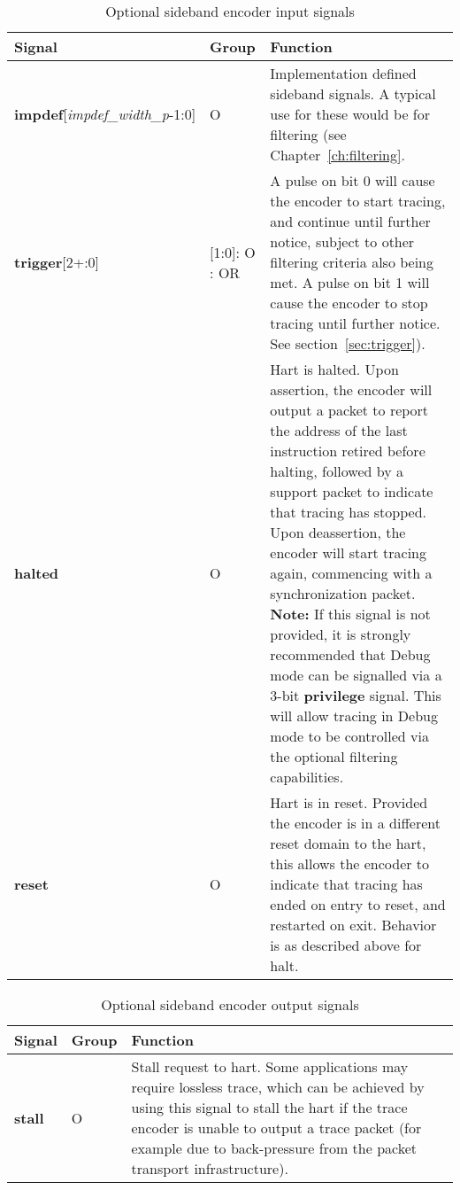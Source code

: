 \begin{table}[htp]
    \centering
    \caption{Optional sideband encoder input signals}
    \label{tab:ingress-side-band}
    \begin{tabulary}{\textwidth}{|l|p{18mm}|p{85mm}|}
        \hline
        \textbf{Signal} & \textbf{Group} & \textbf{Function} \\
        \hline
        \textbf{impdef}[\textit{impdef\_width\_p}-1:0] & O &  Implementation defined sideband signals.  A typical use for
        these would be for filtering (see Chapter~\ref{ch:filtering}.\\
        \hline
        \textbf{trigger}[2+:0] & [1:0]: O \newline 
                                [2+]:  OR & A pulse on bit 0 will cause the encoder to start tracing, and continue until further 
        notice, subject to other filtering criteria also being met.\newline
        A pulse on bit 1 will cause the encoder to stop tracing until further notice.  See section~\ref{sec:trigger}).\\
        \hline
        \textbf{halted} & O & Hart is halted.  Upon assertion, the encoder will output a packet to report the address 
        of the last instruction retired before halting, followed by a support packet to indicate that tracing has stopped. 
        Upon deassertion, the encoder will start tracing again, commencing with a synchronization packet.
        \textbf{Note:} If this signal is not provided, it is strongly recommended that Debug mode can be signalled via a 3-bit 
          \textbf{privilege} signal.  This will allow tracing in Debug mode to be controlled via the optional filtering capabilities.\\
        \hline
        \textbf{reset} & O & Hart is in reset.  Provided the encoder is in a different reset domain to the hart, this
        allows the encoder to indicate that tracing has ended on entry to reset, and restarted on exit.  
        Behavior is as described above for halt.\\
        \hline
    \end{tabulary}
\end{table}

\begin{table}[htp]
    \centering
    \caption{Optional sideband encoder output signals}
    \label{tab:egress-side-band}
    \begin{tabulary}{\textwidth}{|l|l|p{125mm}|}
        \hline
        \textbf{Signal} & \textbf{Group} & \textbf{Function} \\
        \hline
        \textbf{stall} & O & Stall request to hart.  Some applications may require lossless trace, which can be achieved by
        using this signal to stall the hart if the trace encoder is unable to output a trace packet (for example due to 
        back-pressure from the packet transport infrastructure).\\
        \hline
    \end{tabulary}
\end{table}

